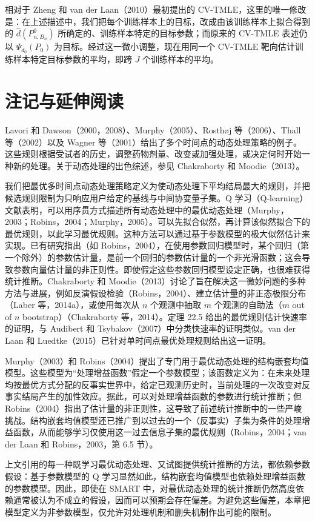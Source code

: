 相对于 Zheng 和 van der Laan（2010）最初提出的 CV-TMLE，这里的唯一修改是：在上述描述中，我们把每个训练样本上的目标，改成由该训练样本上拟合得到的 $\hat d(P_{n,B_n}^0)$ 所确定的、训练样本特定的目标参数；而原来的 CV-TMLE 表述仍以 $\Psi_{d_0}(P_0)$ 为目标。经过这一微小调整，现在用同一个 CV-TMLE 靶向估计训练样本特定目标参数的平均，即跨 $J$ 个训练样本的平均。

\section{注记与延伸阅读}

Lavori 和 Dawson（2000，2008）、Murphy（2005）、Rosthøj 等（2006）、Thall 等（2002）以及 Wagner 等（2001）给出了多个时间点的动态处理策略的例子。这些规则根据受试者的历史，调整药物剂量、改变或加强处理，或决定何时开始一种新的处理。关于动态处理的出色综述，参见 Chakraborty 和 Moodie（2013）。

我们把最优多时间点动态处理策略定义为使动态处理下平均结局最大的规则，并把候选规则限制为只响应用户给定的基线与中间协变量子集。Q 学习（Q-learning）文献表明，可以用序贯方式描述所有动态处理中的最优动态处理（Murphy，2003；Robins，2004；Murphy，2005）。可以先拟合似然，再计算该似然拟合下的最优规则，以此学习最优规则。这种方法可以通过基于参数模型的极大似然估计来实现。已有研究指出（如 Robins，2004），在使用参数回归模型时，某个回归（第一个除外）的参数估计量，是前一个回归的参数估计量的一个非光滑函数；这会导致参数向量估计量的非正则性。即使假定这些参数回归模型设定正确，也很难获得统计推断。Chakraborty 和 Moodie（2013）讨论了旨在解决这一微妙问题的多种方法与进展，例如反演假设检验（Robins，2004）、建立估计量的非正态极限分布（Laber 等，2014a），或使用每次从 $n$ 个观测中抽取 $m$ 个观测的自助法（$m$ out of $n$ bootstrap）（Chakraborty 等，2014）。定理 22.5 给出的最优规则估计快速率的证明，与 Audibert 和 Tsybakov（2007）中分类快速率的证明类似。van der Laan 和 Luedtke（2015）已针对单时间点最优处理规则给出这一证明。

Murphy（2003）和 Robins（2004）提出了专门用于最优动态处理的结构嵌套均值模型。这些模型为“处理增益函数”假定一个参数模型；该函数定义为：在未来处理均按最优方式分配的反事实世界中，给定已观测历史时，当前处理的一次改变对反事实结局产生的加性效应。据此，可以对处理增益函数的参数进行统计推断；但 Robins（2004）指出了估计量的非正则性，这导致了前述统计推断中的一些严峻挑战。结构嵌套均值模型还已推广到以过去的一个（反事实）子集为条件的处理增益函数，从而能够学习仅使用这一过去信息子集的最优规则（Robins，2004；van der Laan 和 Robins，2003，第 6.5 节）。

上文引用的每一种既学习最优动态处理、又试图提供统计推断的方法，都依赖参数假设：基于参数模型的 Q 学习显然如此，结构嵌套均值模型也依赖处理增益函数的参数模型。因此，即使在 SMART 中，对最优动态处理的统计推断仍然高度依赖通常被认为不成立的假设，因而可以预期会存在偏差。为避免这些偏差，本章把模型定义为非参数模型，仅允许对处理机制和删失机制作出可能的限制。
